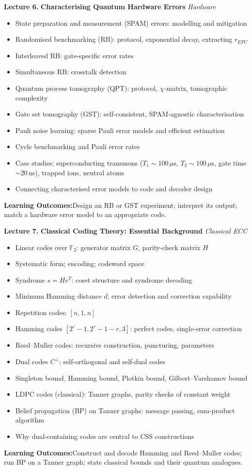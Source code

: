 \documentclass[12pt,oneside]{article}
\newcommand{\lecturetitle}[3]{%
  \vspace{10pt}
  \begin{tcolorbox}[
    enhanced,breakable,
    colback=highlight,colframe=accent,
    arc=2pt,left=10pt,right=8pt,top=7pt,bottom=7pt,boxrule=0.7pt
  ]
    \textbf{\color{accent}Lecture #1.\enspace}%
    {\color{primary}\bfseries #2}%
    \hfill{\small\color{warmgold}\textit{#3}}
  \end{tcolorbox}
  \vspace{-2pt}
}
\newcommand{\topics}[1]{%
  \begin{itemize}[leftmargin=1.5em,itemsep=1.5pt,topsep=3pt,parsep=0pt]
    #1
  \end{itemize}\vspace{2pt}
}
\newcommand{\T}[1]{\item #1}
\newcommand{\keybox}[1]{%
  \begin{tcolorbox}[
    enhanced,colback=lightgray,colframe=rulegray,
    arc=2pt,left=8pt,right=8pt,top=5pt,bottom=5pt,boxrule=0.4pt,
    fontupper=\small
  ]
    \textbf{\color{primary}Learning Outcomes:\enspace}#1
  \end{tcolorbox}\vspace{4pt}
}
\begin{document}
\lecturetitle{6}{Characterising Quantum Hardware Errors}{Hardware}

\topics{
  \T{State preparation and measurement (SPAM) errors: modelling and mitigation}
  \T{Randomised benchmarking (RB): protocol, exponential decay, extracting $r_{EPC}$}
  \T{Interleaved RB: gate-specific error rates}
  \T{Simultaneous RB: crosstalk detection}
  \T{Quantum process tomography (QPT): protocol, $\chi$-matrix, tomographic complexity}
  \T{Gate set tomography (GST): self-consistent, SPAM-agnostic characterisation}
  \T{Pauli noise learning: sparse Pauli error models and efficient estimation}
  \T{Cycle benchmarking and Pauli error rates}
  \T{Case studies: superconducting transmons ($T_1\sim100\,\mu$s, $T_2\sim100\,\mu$s, gate time $\sim20$\,ns), trapped ions, neutral atoms}
  \T{Connecting characterised error models to code and decoder design}
}

\keybox{Design an RB or GST experiment; interpret its output; match a hardware error model to an appropriate code.}

\lecturetitle{7}{Classical Coding Theory: Essential Background}{Classical ECC}

\topics{
  \T{Linear codes over $\mathbb{F}_2$: generator matrix $G$, parity-check matrix $H$}
  \T{Systematic form; encoding; codeword space}
  \T{Syndrome $s=He^T$: coset structure and syndrome decoding}
  \T{Minimum Hamming distance $d$; error detection and correction capability}
  \T{Repetition codes: $[n,1,n]$}
  \T{Hamming codes $[2^r-1, 2^r-1-r, 3]$: perfect codes, single-error correction}
  \T{Reed--Muller codes: recursive construction, puncturing, parameters}
  \T{Dual codes $C^\perp$; self-orthogonal and self-dual codes}
  \T{Singleton bound, Hamming bound, Plotkin bound, Gilbert--Varshamov bound}
  \T{LDPC codes (classical): Tanner graphs, parity checks of constant weight}
  \T{Belief propagation (BP) on Tanner graphs: message passing, sum-product algorithm}
  \T{Why dual-containing codes are central to CSS constructions}
}

\keybox{Construct and decode Hamming and Reed--Muller codes; run BP on a Tanner graph; state classical bounds and their quantum analogues.}

\newpage
\end{document}
